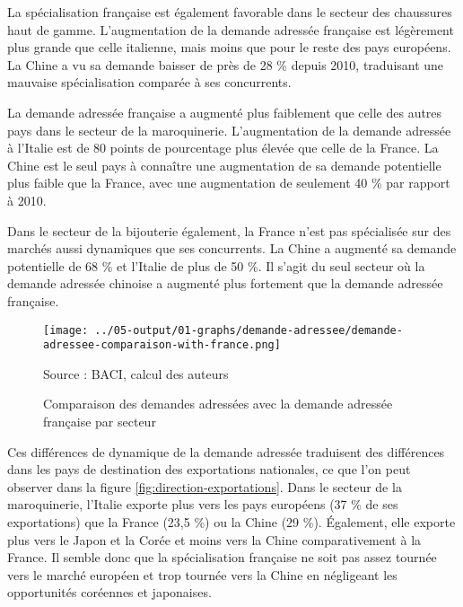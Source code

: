 \documentclass[french,10pt,a4paper]{article}
\begin{document}
La spécialisation française est également favorable dans le secteur des chaussures haut de gamme. L'augmentation de la demande adressée française est légèrement plus grande que celle italienne, mais moins que pour le reste des pays européens. La Chine a vu sa demande baisser de près de 28 \% depuis 2010, traduisant une mauvaise spécialisation comparée à ses concurrents.

La demande adressée française a augmenté plus faiblement que celle des autres pays dans le secteur de la maroquinerie. L'augmentation de la demande adressée à l'Italie est de 80 points de pourcentage plus élevée que celle de la France. La Chine est le seul pays à connaître une augmentation de sa demande potentielle plus faible que la France, avec une augmentation de seulement 40 \% par rapport à 2010.

Dans le secteur de la bijouterie également, la France n'est pas spécialisée sur des marchés aussi dynamiques que ses concurrents. La Chine a augmenté sa demande potentielle de 68 \% et l'Italie de plus de 50 \%. Il s'agit du seul secteur où la demande adressée chinoise a augmenté plus fortement que la demande adressée française. 


\begin{figure}[!h]
  \centering
  \texttt{[image: ../05-output/01-graphs/demande-adressee/demande-adressee-comparaison-with-france.png]}
  \captionsetup{justification=raggedright,singlelinecheck=false, font=small}
  \caption*{Source : BACI, calcul des auteurs}
  \captionsetup{justification=centering, singlelinecheck=true, font=normalsize}
  \caption{Comparaison des demandes adressées avec la demande adressée française par secteur}
  \label{fig:demande-adressee}
\end{figure}

\bigskip

Ces différences de dynamique de la demande adressée traduisent des différences dans les pays de destination des exportations nationales, ce que l'on peut observer dans la figure \ref{fig:direction-exportations}. Dans le secteur de la maroquinerie, l'Italie exporte plus vers les pays européens (37 \% de ses exportations) que la France (23,5 \%) ou la Chine (29 \%). Également, elle exporte plus vers le Japon et la Corée et moins vers la Chine comparativement à la France. Il semble donc que la spécialisation française ne soit pas assez tournée vers le marché européen et trop tournée vers la Chine en négligeant les opportunités coréennes et japonaises.
\end{document}
